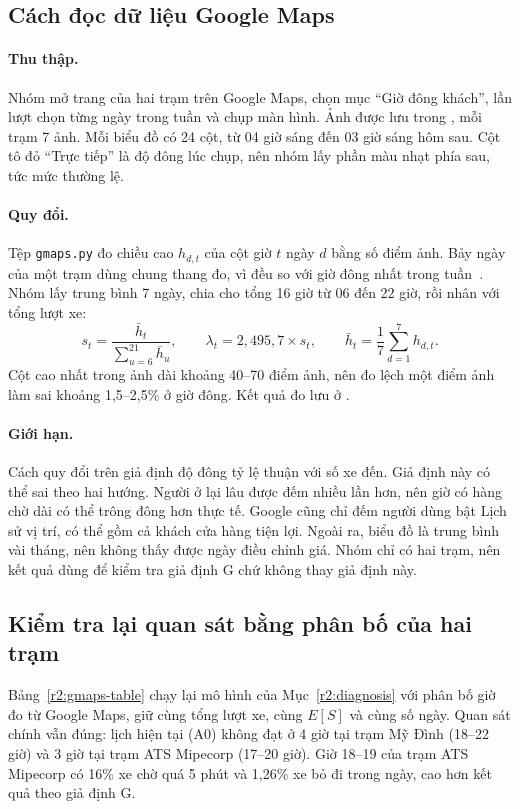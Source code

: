 \subsection{Cách đọc dữ liệu Google Maps}
\label{r2:app-plan}
\noindent
\paragraph{Thu thập.} Nhóm mở trang của hai trạm trên Google Maps, chọn mục
``Giờ đông khách'', lần lượt chọn từng ngày trong tuần và chụp màn hình. Ảnh
được lưu trong , mỗi trạm 7 ảnh. Mỗi biểu đồ có 24
cột, từ 04 giờ sáng đến 03 giờ sáng hôm sau. Cột tô đỏ ``Trực tiếp'' là độ
đông lúc chụp, nên nhóm lấy phần màu nhạt phía sau, tức mức thường lệ.

\paragraph{Quy đổi.} Tệp \texttt{gmaps.py} đo chiều cao $h_{d,t}$ của cột giờ
$t$ ngày $d$ bằng số điểm ảnh. Bảy ngày của một trạm dùng chung thang đo, vì
đều so với giờ đông nhất trong tuần~\cite{gmapshelp}. Nhóm lấy trung bình 7
ngày, chia cho tổng 16 giờ từ 06 đến 22 giờ, rồi nhân với tổng lượt xe:
\begin{equation}
s_t=\frac{\bar h_t}{\sum_{u=6}^{21}\bar h_u},\qquad
\lambda_t=2,495{,}7\times s_t,\qquad
\bar h_t=\frac{1}{7}\sum_{d=1}^{7}h_{d,t}.
\end{equation}
Cột cao nhất trong ảnh dài khoảng 40--70 điểm ảnh, nên đo lệch một điểm ảnh
làm sai khoảng 1,5--2,5\% ở giờ đông. Kết quả đo lưu ở
.

\paragraph{Giới hạn.} Cách quy đổi trên giả định độ đông tỷ lệ thuận với số xe
đến. Giả định này có thể sai theo hai hướng. Người ở lại lâu được đếm nhiều
lần hơn, nên giờ có hàng chờ dài có thể trông đông hơn thực tế. Google cũng
chỉ đếm người dùng bật Lịch sử vị trí, có thể gồm cả khách cửa hàng tiện lợi.
Ngoài ra, biểu đồ là trung bình vài tháng, nên không thấy được ngày điều chỉnh
giá. Nhóm chỉ có hai trạm, nên kết quả dùng để kiểm tra giả định G chứ không
thay giả định này.

\subsection{Kiểm tra lại quan sát bằng phân bố của hai trạm}
\label{r2:gmaps}
\noindent
Bảng~\ref{r2:gmaps-table} chạy lại mô hình của Mục~\ref{r2:diagnosis} với phân bố giờ đo từ Google Maps, giữ cùng tổng lượt xe, cùng $E[S]$ và cùng số ngày. Quan sát chính vẫn đúng: lịch hiện tại (A0) không đạt ở 4 giờ tại trạm Mỹ Đình (18--22 giờ) và 3 giờ tại trạm ATS Mipecorp (17--20 giờ). Giờ 18--19 của trạm ATS Mipecorp có 16\% xe chờ quá 5 phút và 1,26\% xe bỏ đi trong ngày, cao hơn kết quả theo giả định G.

